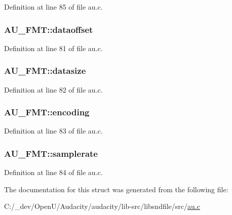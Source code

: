 Definition at line 85 of file au.\+c.

\subsubsection[{\texorpdfstring{dataoffset}{dataoffset}}]{ A\+U\+\_\+\+F\+M\+T\+::dataoffset}\hypertarget{struct_a_u___f_m_t_a83149000ae22c56c9aa42c68066586a9}{}\label{struct_a_u___f_m_t_a83149000ae22c56c9aa42c68066586a9}


Definition at line 81 of file au.\+c.

\subsubsection[{\texorpdfstring{datasize}{datasize}}]{ A\+U\+\_\+\+F\+M\+T\+::datasize}\hypertarget{struct_a_u___f_m_t_a97f85bfafdae48717307bbf8db1ee168}{}\label{struct_a_u___f_m_t_a97f85bfafdae48717307bbf8db1ee168}


Definition at line 82 of file au.\+c.

\subsubsection[{\texorpdfstring{encoding}{encoding}}]{ A\+U\+\_\+\+F\+M\+T\+::encoding}\hypertarget{struct_a_u___f_m_t_adeebf6b8f89f5904213a54d082a38cbf}{}\label{struct_a_u___f_m_t_adeebf6b8f89f5904213a54d082a38cbf}


Definition at line 83 of file au.\+c.

\subsubsection[{\texorpdfstring{samplerate}{samplerate}}]{ A\+U\+\_\+\+F\+M\+T\+::samplerate}\hypertarget{struct_a_u___f_m_t_a478b9bcd00bcdac55506c8b868da0d8b}{}\label{struct_a_u___f_m_t_a478b9bcd00bcdac55506c8b868da0d8b}


Definition at line 84 of file au.\+c.



The documentation for this struct was generated from the following file\+:\begin{DoxyCompactItemize}
\item 
C\+:/\+\_\+dev/\+Open\+U/\+Audacity/audacity/lib-\/src/libsndfile/src/\hyperlink{au_8c}{au.\+c}\end{DoxyCompactItemize}
